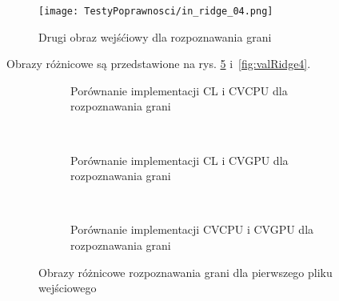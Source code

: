 \begin{figure}
\begin{center}
\texttt{[image: TestyPoprawnosci/in\_ridge\_04.png]}
\end{center}
\caption{Drugi obraz wejśćiowy dla rozpoznawania grani}
\label{fig:valRidge04}
\end{figure}

Obrazy różnicowe są przedstawione na rys. \ref{fig:valRidge1} i~\ref{fig:valRidge4}. 

\begin{figure}
\begin{subfigure}[t]{0.3\textwidth}
	\centering
	\setlength\fboxsep{0pt}
	\setlength\fboxrule{0.5pt}
	\caption{Porównanie implementacji CL i CVCPU dla rozpoznawania grani}
	\label{fig:valRidge1CLCVCPU}
\end{subfigure}
~
\begin{subfigure}[t]{0.3\textwidth}
	\centering
	\setlength\fboxsep{0pt}
	\setlength\fboxrule{0.5pt}
	\caption{Porównanie implementacji CL i CVGPU dla rozpoznawania grani}
	\label{fig:valRidge1CLCVGPU}
\end{subfigure}
~
\begin{subfigure}[t]{0.3\textwidth}
	\centering
	\setlength\fboxsep{0pt}
	\setlength\fboxrule{0.5pt}
	\caption{Porównanie implementacji CVCPU i CVGPU dla rozpoznawania grani}
	\label{fig:valRidge1CVCPUCVGPU}                 
\end{subfigure}
\caption{Obrazy różnicowe rozpoznawania grani dla pierwszego pliku wejściowego}
\label{lena_scales}
\label{fig:valRidge1}
\end{figure}

